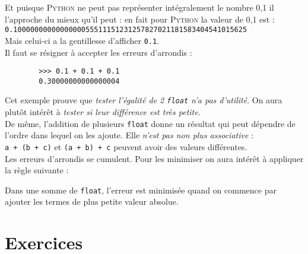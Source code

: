 Et puisque \textsc{Python} ne peut pas représenter intégralement le nombre 0,1 il l'approche du mieux qu'il peut : en fait pour \textsc{Python} la
valeur de 0,1 est :\\

\texttt{0.1000000000000000055511151231257827021181583404541015625}\\

Mais celui-ci a la gentillesse d'afficher \texttt{0.1}.\\

Il faut se résigner à accepter les erreurs d'arrondis :
\begin{pyc}
    \begin{verbatim}
        >>> 0.1 + 0.1 + 0.1
        0.30000000000000004
    \end{verbatim}
\end{pyc}

Cet exemple prouve que \textit{tester l'égalité de 2 \texttt{float} n'a pas d'utilité}. On aura plutôt intérêt à \textit{tester si leur différence est
    très petite}.\\

De même, l'addition de plusieurs \texttt{float} donne un résultat qui peut dépendre de l'ordre dans lequel on les ajoute.
Elle \textit{n'est pas non plus associative} : \\

\texttt{a + (b + c)} et \texttt{(a + b) + c} peuvent avoir des valeurs différentes.\\


Les erreurs d'arrondis se cumulent. Pour les minimiser on aura intérêt à appliquer la règle suivante :

\begin{propriete}
    Dans une somme de \texttt{float}, l'erreur est minimisée quand on commence par ajouter les termes de plus petite valeur absolue.
\end{propriete}

\section{Exercices}

